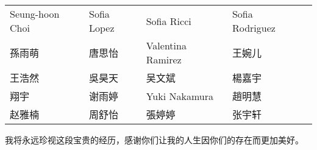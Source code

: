{\begin{longtable}{lllll}
                 Seung-hoon Choi  & Sofia Lopez     & Sofia Ricci       & Sofia Rodriguez  \\
                 孫雨萌              & 唐思怡             & Valentina Ramirez & 王婉儿              \\
                 王浩然              & 吳昊天             & 吴文斌               & 楊嘉宇              \\
                 翔宇               & 谢雨婷             & Yuki Nakamura     & 趙明慧              \\
                 赵雅楠              & 周舒怡             & 張婷婷               & 张宇轩              \\
    \end{longtable}\par
    我将永远珍视这段宝贵的经历，感谢你们让我的人生因你们的存在而更加美好。\par
}
